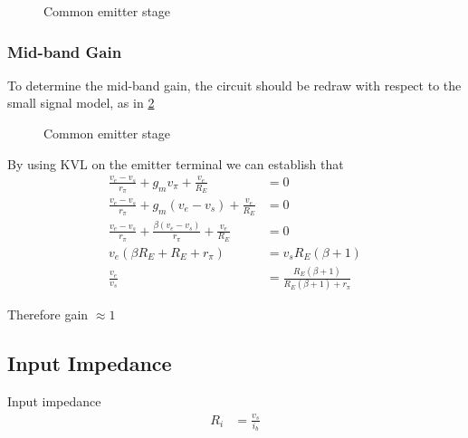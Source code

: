 \documentclass[a4paper,11pt]{article}
\begin{document}
\begin{figure}[H]
	\centering
	\caption{Common emitter stage}
	\label{fig:collector}
	\hfill
\end{figure}

\subsubsection{Mid-band Gain}
To determine the mid-band gain, the circuit should be redraw with respect to the small signal model, as in \ref{fig:ss_collector}

\begin{figure}[H]
	\centering
	\caption{Common emitter stage}
	\label{fig:ss_collector}
	\hfill
\end{figure}

By using KVL on the emitter terminal we can establish that 
\begin{align}
\frac{v_e - v_s}{r_\pi} + g_m v_\pi +\frac{v_e}{R_E} &= 0 \label{eq:emitter2} \\
\frac{v_e - v_s}{r_\pi} + g_m (v_e - v_s) +\frac{v_e}{R_E} &= 0 \nonumber \\
\frac{v_e - v_s}{r_\pi} + \frac{\beta (v_e - v_s)}{r_\pi} +\frac{v_e}{R_E} &= 0 \nonumber \\
v_e(\beta R_E + R_E + r_\pi) &= v_s R_E(\beta + 1) \nonumber \\
\frac{v_e}{v_s} &= \frac{R_E (\beta + 1)}{R_E (\beta + 1) + r_\pi} \label{eq:collector_gain}
\end{align}

Therefore gain $\approx 1$

\subsection{Input Impedance}
Input impedance 
\begin{align}
R_i &= \frac{v_s}{i_b} \label{eq:Ri}
\end{align}
\end{document}
